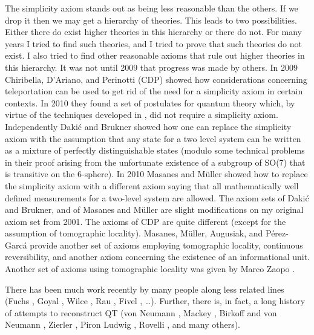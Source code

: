 \documentclass[10pt]{article}
\begin{document}
The simplicity axiom stands out as being less reasonable than the others.  If we drop it then we may get a hierarchy of theories.  This leads to two possibilities.  Either there do exist higher theories in this hierarchy or there do not.  For many years I tried to find such theories, and I tried to prove that such theories do not exist.  I also tried to find other reasonable axioms that rule out higher theories in this hierarchy.  It was not until 2009 that progress was made by others.   In 2009 Chiribella, D'Ariano, and Perinotti (CDP) \cite{chiribella2010probabilistic} showed how considerations concerning teleportation can be used to get rid of the need for a simplicity axiom in certain contexts.  In 2010 \cite{chiribella2010informational} they found a set of postulates for quantum theory which, by virtue of the techniques developed in \cite{chiribella2010probabilistic}, did not require a simplicity axiom.  Independently Daki\'c and Brukner \cite{dakic2009quantum} showed how one can replace the simplicity axiom with the assumption that any state for a two level system can be written as a mixture of perfectly distinguishable states (modulo some technical problems in their proof arising from the unfortunate existence of a subgroup of SO(7) that is transitive on the 6-sphere).  In 2010 Masanes and M\"uller \cite{masanes2010derivation} showed how to replace the simplicity axiom with a different axiom saying that all mathematically well defined measurements for a two-level system are allowed.   The axiom sets of Daki\'c and Brukner, and of Masanes and M\"uller are slight modifications on my original axiom set from 2001.  The axioms of CDP are quite different (except for the assumption of tomographic locality). Masanes, M\"uller, Augusiak, and P\'erez-Garc\'a provide another set of axioms employing tomographic locality, continuous reversibility, and another axiom concerning the existence of an informational unit.  Another set of axioms using tomographic locality was given by Marco Zaopo \cite{zaopo2012information}.

There has been much work recently by many people along less related lines (Fuchs \cite{fuchs2010quantum}, Goyal \cite{goyal2008information}, Wilce \cite{wilce2009four}, Rau \cite{rau2009quantum, rau2010measurement}, Fivel \cite{fivel2010derivation}, \dots).  Further, there is, in fact, a long history of attempts to reconstruct QT (von Neumann \cite{von1996mathematical}, Mackey \cite{mackey1963mathematical}, Birkoff and von Neumann \cite{birkhoff1936logic}, Zierler \cite{zierler1975axioms}, Piron \cite{piron1964axiomatique} Ludwig \cite{ludwig1985axiomatic}, Rovelli \cite{rovelli1996relational}, and many others).
\end{document}

